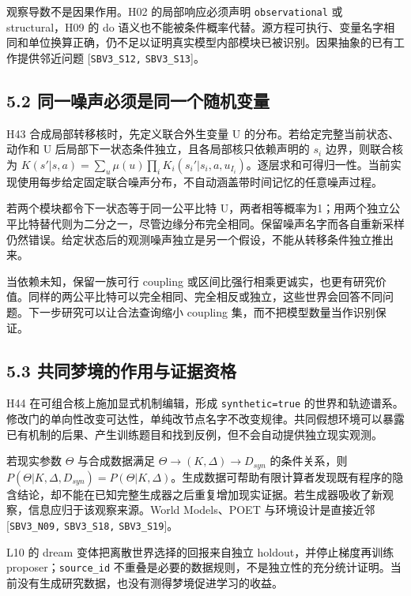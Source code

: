 \documentclass[
  10pt,
]{article}
\begin{document}
观察导数不是因果作用。H02 的局部响应必须声明 \nolinkurl{observational}
或 structural，H09 的 do
语义也不能被条件概率代替。源方程可执行、变量名字相同和单位换算正确，仍不足以证明真实模型内部模块已被识别。因果抽象的已有工作提供邻近问题
{[}\nolinkurl{SBV3_S12,} \nolinkurl{SBV3_S13}{]}。

\subsection{5.2
同一噪声必须是同一个随机变量}\label{ux540cux4e00ux566aux58f0ux5fc5ux987bux662fux540cux4e00ux4e2aux968fux673aux53d8ux91cf}

H43 合成局部转移核时，先定义联合外生变量 U
的分布。若给定完整当前状态、动作和 U
后局部下一状态条件独立，且各局部核只依赖声明的 \(s_i\) 边界，则联合核为
\(K(s'|s,a)=\sum_u\mu(u)\prod_i K_i(s_i'|s_i,a,u_{I_i})\)。逐层求和可得归一性。当前实现使用每步给定固定联合噪声分布，不自动涵盖带时间记忆的任意噪声过程。

若两个模块都令下一状态等于同一公平比特
U，两者相等概率为1；用两个独立公平比特替代则为二分之一，尽管边缘分布完全相同。保留噪声名字而各自重新采样仍然错误。给定状态后的观测噪声独立是另一个假设，不能从转移条件独立推出来。

当依赖未知，保留一族可行 coupling
或区间比强行相乘更诚实，也更有研究价值。同样的两公平比特可以完全相同、完全相反或独立，这些世界会回答不同问题。下一步研究可以让合法查询缩小
coupling 集，而不把模型数量当作识别保证。

\subsection{5.3
共同梦境的作用与证据资格}\label{ux5171ux540cux68a6ux5883ux7684ux4f5cux7528ux4e0eux8bc1ux636eux8d44ux683c}

H44 在可组合核上施加显式机制编辑，形成 \nolinkurl{synthetic=true}
的世界和轨迹谱系。修改门的单向性改变可达性，单纯改节点名字不改变规律。共同假想环境可以暴露已有机制的后果、产生训练题目和找到反例，但不会自动提供独立现实观测。

若现实参数 \(\Theta\) 与合成数据满足 \(\Theta\to(K,\Delta)\to D_{syn}\)
的条件关系，则
\(P(\Theta|K,\Delta,D_{syn})=P(\Theta|K,\Delta)\)。生成数据可帮助有限计算者发现既有程序的隐含结论，却不能在已知完整生成器之后重复增加现实证据。若生成器吸收了新观察，信息应归于该观察来源。World
Models、POET 与环境设计是直接近邻 {[}\nolinkurl{SBV3_N09,}
\nolinkurl{SBV3_S18,} \nolinkurl{SBV3_S19}{]}。

L10 的 dream 变体把离散世界选择的回报来自独立 holdout，并停止梯度再训练
proposer；\nolinkurl{source_id}
不重叠是必要的数据规则，不是独立性的充分统计证明。当前没有生成研究数据，也没有测得梦境促进学习的收益。
\end{document}
